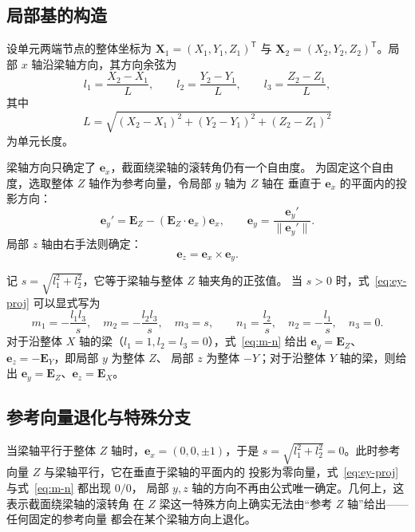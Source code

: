 \documentclass[UTF8,a4paper,11pt]{ctexart}
\begin{document}
\subsection{局部基的构造}

设单元两端节点的整体坐标为 $\mathbf{X}_1=(X_1,Y_1,Z_1)^{\mathsf T}$ 与
$\mathbf{X}_2=(X_2,Y_2,Z_2)^{\mathsf T}$。局部 $x$ 轴沿梁轴方向，其方向余弦为
\begin{equation}\label{eq:ex}
l_1=\frac{X_2-X_1}{L},\qquad
l_2=\frac{Y_2-Y_1}{L},\qquad
l_3=\frac{Z_2-Z_1}{L},
\end{equation}
其中
\begin{equation}
L=\sqrt{(X_2-X_1)^2+(Y_2-Y_1)^2+(Z_2-Z_1)^2}
\end{equation}
为单元长度。

梁轴方向只确定了 $\mathbf{e}_x$，截面绕梁轴的滚转角仍有一个自由度。
为固定这个自由度，选取整体 $Z$ 轴作为参考向量，令局部 $y$ 轴为 $Z$ 轴在
垂直于 $\mathbf{e}_x$ 的平面内的投影方向：
\begin{equation}\label{eq:ey-proj}
\mathbf{e}_y'=\mathbf{E}_Z-\left(\mathbf{E}_Z\cdot\mathbf{e}_x\right)\mathbf{e}_x,
\qquad
\mathbf{e}_y=\frac{\mathbf{e}_y'}{\|\mathbf{e}_y'\|}.
\end{equation}
局部 $z$ 轴由右手法则确定：
\begin{equation}
\mathbf{e}_z=\mathbf{e}_x\times\mathbf{e}_y.
\end{equation}

记 $s=\sqrt{l_1^2+l_2^2}$，它等于梁轴与整体 $Z$ 轴夹角的正弦值。
当 $s>0$ 时，式~\eqref{eq:ey-proj} 可以显式写为
\begin{equation}\label{eq:m-n}
m_1=-\frac{l_1l_3}{s},\quad
m_2=-\frac{l_2l_3}{s},\quad
m_3=s,
\qquad
n_1=\frac{l_2}{s},\quad
n_2=-\frac{l_1}{s},\quad
n_3=0.
\end{equation}
对于沿整体 $X$ 轴的梁（$l_1=1,l_2=l_3=0$），式~\eqref{eq:m-n} 给出
$\mathbf{e}_y=\mathbf{E}_Z$、$\mathbf{e}_z=-\mathbf{E}_Y$，即局部 $y$ 为整体 $Z$、
局部 $z$ 为整体 $-Y$；对于沿整体 $Y$ 轴的梁，则给出
$\mathbf{e}_y=\mathbf{E}_Z$、$\mathbf{e}_z=\mathbf{E}_X$。

\subsection{参考向量退化与特殊分支}

当梁轴平行于整体 $Z$ 轴时，$\mathbf{e}_x=(0,0,\pm1)$，于是
$s=\sqrt{l_1^2+l_2^2}=0$。此时参考向量 $Z$ 与梁轴平行，它在垂直于梁轴的平面内的
投影为零向量，式~\eqref{eq:ey-proj} 与式~\eqref{eq:m-n} 都出现 $0/0$，
局部 $y,z$ 轴的方向不再由公式唯一确定。几何上，这表示截面绕梁轴的滚转角
在 $Z$ 梁这一特殊方向上确实无法由“参考 $Z$ 轴”给出——任何固定的参考向量
都会在某个梁轴方向上退化。
\end{document}
